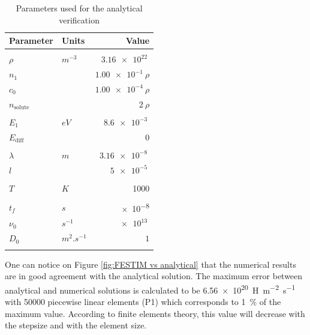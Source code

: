 \begin{table}
    \centering
    \begin{tabular}{p{2.3cm} p{2cm} r}
        Parameter & Units & Value \\
        \hline
        \\
        $\rho$ & $\si{m^{-3}}$ &$\SI{3.16e22}{}$ \\
        $n_1$ & & $\SI{1.00e-1}{} \rho$ \\
        $c_0$ & & $\SI{1.00e-4}{} \rho$\\
        $n_\mathrm{solute}$ & & $2 \:\rho$\\
        \\
        $E_1$ & $\si{eV}$ & $\SI{8.6e-3}{}$ \\
        $E_\mathrm{diff}$ & & $0$ \\
        \\
        $\lambda$ & $\si{m}$ & $\SI{3.16e-8}{}$  \\
        $l$ & & $\SI{5e-5}{}$\\
        \\
        $T$ & $\si{K}$ & 1000 \\
        \\
        $t_f$ & $\si{s}$ & \SI{e-8}{} \\
        $\nu_0$ & $\si{s^{-1}}$ & $\SI{e13}{}$ \\
        $D_0$ & $\si{m^2.s^{-1}}$ & $1$ \\
        \\
    \end{tabular}
    \caption{Parameters used for the analytical verification}
    \label{tab:parameters analytical verification}
\end{table}
One can notice on Figure \ref{fig:FESTIM vs analytical} that the numerical results are in good agreement with the analytical solution.
The maximum error between analytical and numerical solutions is calculated to be \SI{6.56e20}{H.m^{-2}.s^{-1}} with 50000 piecewise linear elements (P1) which corresponds to \SI{1}{\%} of the maximum value.
According to finite elements theory, this value will decrease with the stepsize and with the element size.
